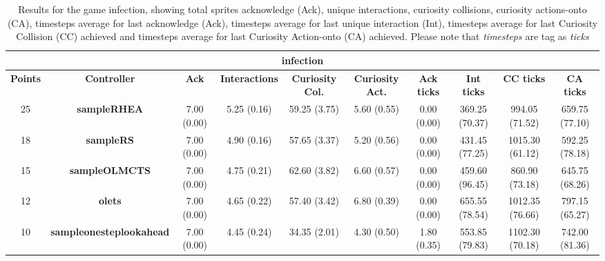 \begin{table*}[!t]
\begin{center}
\begin{adjustbox}{width=1\textwidth}
\begin{tabular}{|c|c|c|c|c|c|c|c|c|c|}
\multicolumn{10}{c}{\textbf{infection}}\\
\hline
\textbf{Points} & \textbf{Controller} & \textbf{Ack} & \textbf{Interactions} & \textbf{Curiosity Col.} & \textbf{Curiosity Act.} & \textbf{Ack ticks} & \textbf{Int ticks} & \textbf{CC ticks} & \textbf{CA ticks}\\
\hline
25 & \textbf{sampleRHEA} & 7.00 (0.00) & 5.25 (0.16) & 59.25 (3.75) & 5.60 (0.55) & 0.00 (0.00) & 369.25 (70.37) & 994.05 (71.52) & 659.75 (77.10)
 \\
\hline
18 & \textbf{sampleRS} & 7.00 (0.00) & 4.90 (0.16) & 57.65 (3.37) & 5.20 (0.56) & 0.00 (0.00) & 431.45 (77.25) & 1015.30 (61.12) & 592.25 (78.18)
 \\
\hline
15 & \textbf{sampleOLMCTS} & 7.00 (0.00) & 4.75 (0.21) & 62.60 (3.82) & 6.60 (0.57) & 0.00 (0.00) & 459.60 (96.45) & 860.90 (73.18) & 645.75 (68.26)
 \\
\hline
12 & \textbf{olets} & 7.00 (0.00) & 4.65 (0.22) & 57.40 (3.42) & 6.80 (0.39) & 0.00 (0.00) & 655.55 (78.54) & 1012.35 (76.66) & 797.15 (65.27)
 \\
\hline
10 & \textbf{sampleonesteplookahead} & 7.00 (0.00) & 4.45 (0.24) & 34.35 (2.01) & 4.30 (0.50) & 1.80 (0.35) & 553.85 (79.83) & 1102.30 (70.18) & 742.00 (81.36)
 \\
\hline
\end{tabular}
\end{adjustbox}
\caption{Results for the game infection, showing total sprites acknowledge (Ack), unique interactions, curiosity collisions, curiosity actions-onto (CA), timesteps average for last acknowledge (Ack),  timesteps average for last unique interaction (Int), timesteps average for last Curiosity Collision (CC) achieved and timesteps average for last Curiosity Action-onto (CA) achieved. Please note that \textit{timesteps} are tag as \textit{ticks}}
\label{tab:weights}
\end{center}
\end{table*}
